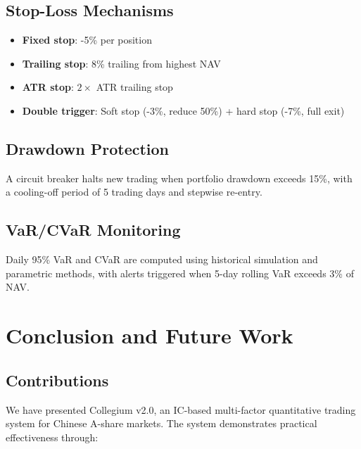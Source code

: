 \documentclass[12pt]{article}
\begin{document}
\subsection{Stop-Loss Mechanisms}

\begin{itemize}
    \item \textbf{Fixed stop}: -5\% per position
    \item \textbf{Trailing stop}: 8\% trailing from highest NAV
    \item \textbf{ATR stop}: $2\times$ ATR trailing stop
    \item \textbf{Double trigger}: Soft stop (-3\%, reduce 50\%) + hard stop (-7\%, full exit)
\end{itemize}

\subsection{Drawdown Protection}

A circuit breaker halts new trading when portfolio drawdown exceeds 15\%, with a cooling-off period of 5 trading days and stepwise re-entry.

\subsection{VaR/CVaR Monitoring}

Daily 95\% VaR and CVaR are computed using historical simulation and parametric methods, with alerts triggered when 5-day rolling VaR exceeds 3\% of NAV.

\section{Conclusion and Future Work}

\subsection{Contributions}

We have presented Collegium v2.0, an IC-based multi-factor quantitative trading system for Chinese A-share markets. The system demonstrates practical effectiveness through:
\end{document}

